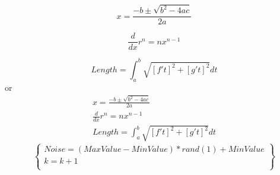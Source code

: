 \documentclass{article}
\begin{document}
\lipsum[11]
 \begin{equation}
x=\frac{-b\pm\sqrt{b^2-4ac}}{2a}
\end{equation}

\begin{equation}
\frac{d}{dx}r^n=nx^{n-1}
\end{equation}

\begin{equation}
Length=\int_{a}^{b}\sqrt{[f't]^2+[g't]^2}dt
\end{equation}
or     
\begin{gather}
x=\frac{-b\pm\sqrt{b^2-4ac}}{2a}             \\
\frac{d}{dx}r^n=nx^{n-1}                     \\
Length=\int_{a}^{b}\sqrt{[f't]^2+[g't]^2}dt 
\end{gather}
\lipsum[11]
\[
    \left\{
    \begin{array}{ll}
        Noise = (MaxValue-MinValue)*rand(1)+MinValue\\  
        k=k+1\\
    \end{array}
    \right\}
\]
\end{document}
